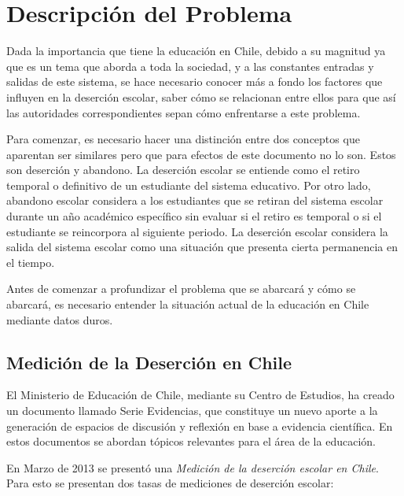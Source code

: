 \chapter{Descripción del Problema}

Dada la importancia que tiene la educación en Chile, debido a su magnitud ya que es un tema que aborda a toda la sociedad, y a las constantes entradas y salidas de este sistema, se hace necesario conocer más a fondo los factores que influyen en la deserción escolar, saber cómo se relacionan entre ellos para que así las autoridades correspondientes sepan cómo enfrentarse a este problema.

Para comenzar, es necesario hacer una distinción entre dos conceptos que aparentan ser similares pero que para efectos de este documento no lo son. Estos son deserción y abandono. La deserción escolar se entiende como el retiro temporal o definitivo de un estudiante del sistema educativo. Por otro lado, abandono escolar considera a los estudiantes que se retiran del sistema escolar durante un año académico específico sin evaluar si el retiro es temporal o si el estudiante se reincorpora al siguiente periodo. La deserción escolar considera la salida del sistema escolar como una situación que presenta cierta permanencia en el tiempo\cite{mineduc}.

Antes de comenzar a profundizar el problema que se abarcará y cómo se abarcará, es necesario entender la situación actual de la educación en Chile mediante datos duros.

\newpage

\section{Medición de la Deserción en Chile}

El Ministerio de Educación de Chile, mediante su Centro de Estudios, ha creado un documento llamado Serie Evidencias, que constituye un nuevo aporte a la generación de espacios de discusión y reflexión en base a evidencia científica. En estos documentos se abordan tópicos relevantes para el área de la educación.

En Marzo de 2013 se presentó una \textit{Medición de la deserción escolar en Chile}. Para esto se presentan dos tasas de mediciones de deserción escolar\cite{serieevidencias}:

